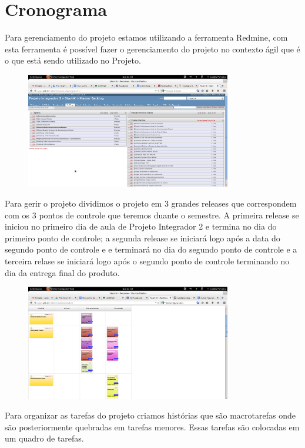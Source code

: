 \chapter*[Cronograma]{Cronograma}

Para gerenciamento do projeto estamos utilizando a ferramenta Redmine, com esta ferramenta é possível fazer o gerenciamento do projeto no contexto ágil que é o que está sendo utilizado no Projeto.

\begin{figure}[h]
  \centering
  \includegraphics[width=0.8\textwidth]
      {figuras/backlogs.eps}
  \caption[redmine-backlog]
  \label{Redmine e backlog do projeto}
\end{figure}

Para gerir o projeto dividimos o projeto em 3 grandes releases que correspondem com os 3 pontos de controle que teremos duante o semestre. A primeira release se iniciou no primeiro dia de aula de Projeto Integrador 2 e termina no dia do primeiro ponto de controle; a segunda release se iniciará logo após a data do segundo ponto de controle e e terminará no dia do segundo ponto de controle e a terceira relase se iniciará logo após o segundo ponto de controle terminando no dia da entrega final do produto.

\begin{figure}[h]
  \centering
  \includegraphics[width=0.8\textwidth]
      {figuras/quadrotarefas.eps}
  \caption[quadro-de-tarefas]
  \label{Quadro de tarefas}
\end{figure}
Para organizar as tarefas do projeto criamos histórias que são macrotarefas onde são posteriormente quebradas em tarefas menores. Essas tarefas são colocadas em um quadro de tarefas.


  
